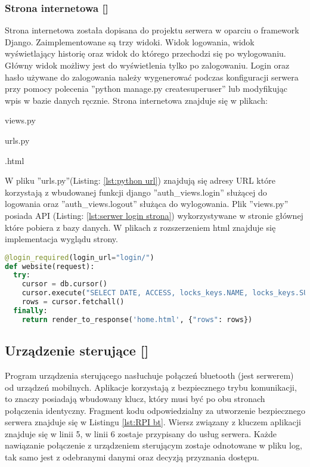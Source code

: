 	\subsubsection{Strona internetowa [\StudentB]}
	Strona internetowa została dopisana do projektu serwera w oparciu o framework Django. Zaimplementowane są trzy widoki. Widok logowania, widok wyświetlający historię oraz widok do którego przechodzi się po wylogowaniu. Główny widok możliwy jest do wyświetlenia tylko po zalogowaniu. Login oraz hasło używane do zalogowania należy wygenerować podczas konfiguracji serwera przy pomocy polecenia ''python manage.py createsuperuser'' lub modyfikując wpis w bazie danych ręcznie. Strona internetowa znajduje się w plikach:
	\begin{itemize*}
		\item views.py
		\item urls.py
		\item *.html
	\end{itemize*}
 
	W pliku ''urls.py''(Listing: \ref{lst:python url}) znajdują się adresy URL które korzystają z wbudowanej funkcji django ''auth\_views.login'' służącej do logowania oraz ''auth\_views.logout'' służąca do wylogowania. Plik ''views.py'' posiada API (Listing: \ref{lst:serwer login strona}) wykorzystywane w stronie głównej które pobiera z bazy danych. W plikach z rozszerzeniem html znajduje się implementacja wyglądu strony.
	
	{\footnotesize 
		\begin{lstlisting}[caption={API logowania do strony internetowej}, label={lst:serwer login strona}, language=Python]	
@login_required(login_url="login/")
def website(request):
  try:
    cursor = db.cursor()
    cursor.execute("SELECT DATE, ACCESS, locks_keys.NAME, locks_keys.SURNAME, locks.NAME AS 'ZAMEK' FROM access_to_locks, locks_keys, locks WHERE locks_keys.ID_KEY = access_to_locks.ID_KEY AND locks.ID_LOCK = access_to_locks.ID_KEY ORDER BY DATE DESC")
    rows = cursor.fetchall()
  finally:
    return render_to_response('home.html', {"rows": rows})
		\end{lstlisting}}
\subsection{Urządzenie sterujące [\StudentA]}
Program urządzenia sterującego nasłuchuje połączeń bluetooth (jest serwerem) od urządzeń mobilnych. Aplikacje korzystają z bezpiecznego trybu komunikacji, to znaczy posiadają wbudowany klucz, który musi być po obu stronach połączenia identyczny. Fragment kodu odpowiedzialny za utworzenie bezpiecznego serwera znajduje się w Listingu \ref{lst:RPI bt}. Wiersz związany z kluczem aplikacji znajduje się w linii 5, w linii 6 zostaje przypisany do usług serwera. Każde nawiązanie połączenie z urządzeniem sterującym zostaje odnotowane w pliku log, tak samo jest z odebranymi danymi oraz decyzją przyznania dostępu.
 
